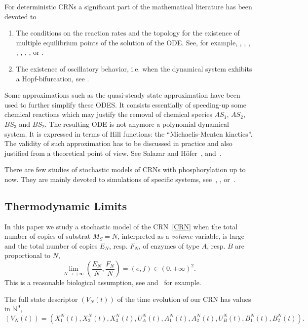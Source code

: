 \documentclass[english]{amsart}
\newcommand{\N}{\ensuremath{\mathbb{N}}}
\numberwithin{proposition}{section}
\begin{document}
For deterministic CRNs  a significant part of the mathematical literature has been devoted to
\begin{enumerate}
\item The conditions on the reaction rates and the topology for the existence of multiple equilibrium points of the solution of the ODE. See, for example, \citet{Barab}, \citet{Bazzani2012}, \citet{Feliu2022}, \citet{Holstein}, \citet{Flockerzi2014}, \citet{Markevich2004}, \citet{Salazar2009}, or \citet{Thomson2009}.
\item The existence of oscillatory behavior, i.e. when the dynamical system exhibits a Hopf-bifurcation, see \citet{Conradi2019,Conradi2024} \citet{Feliu2024}.
\end{enumerate}
Some approximations such as the quasi-steady state approximation have been used to further simplify these ODES. It consists essentially of speeding-up some chemical reactions which may justify the removal of chemical species ${ AS}_1$, ${ AS}_2$, ${ BS}_3$ and ${ BS}_2$. The resulting ODE is not anymore a polynomial dynamical system. It is expressed in terms of Hill functions: the ``Michaelis-Menten kinetics''. The validity of such approximation has to be discussed in practice and also justified from a theoretical point of view. See Salazar and H\"ofer~\cite{Salazar2009,Salazar2006}, and~\citet{Gunawardena2014}.

There are few studies of stochastic models of CRNs with phosphorylation up to now. They are mainly devoted to simulations of specific systems, see~\citet{Steijaert}, \citet{Lopez2018}, or~\citet{Zippo2025}.

\subsection{Thermodynamic Limits}
In this paper we study a stochastic model of the CRN~\eqref{CRN} when the total number of copies of substrat $M_S{=}N$, interpreted as a {\em volume} variable,  is large and  
the total number of copies $E_N$, resp. $F_N$, of  enzymes of type ${ A}$, resp. ${ B}$ are proportional to $N$,
\begin{equation}\label{ScalIntr}
\lim_{N\to+\infty}\left(\frac{E_N}{N},\frac{F_N}{N}\right)=(e,f) \in (0, +\infty)^2.
\end{equation}
This is a reasonable biological assumption, see \citet{Albe} and~\citet{Thomson2009} for example. 

The full state descriptor  $(V_N(t))$ of the time evolution of our CRN has values in $\N^9$,
\[
(V_N(t))=(X_1^N(t),X_2^N(t),X_3^N(t),U_A^N(t),A_1^N(t),A_2^N(t),U_B^N(t),B_1^N(t),B_2^N(t)).
\]
\end{document}
